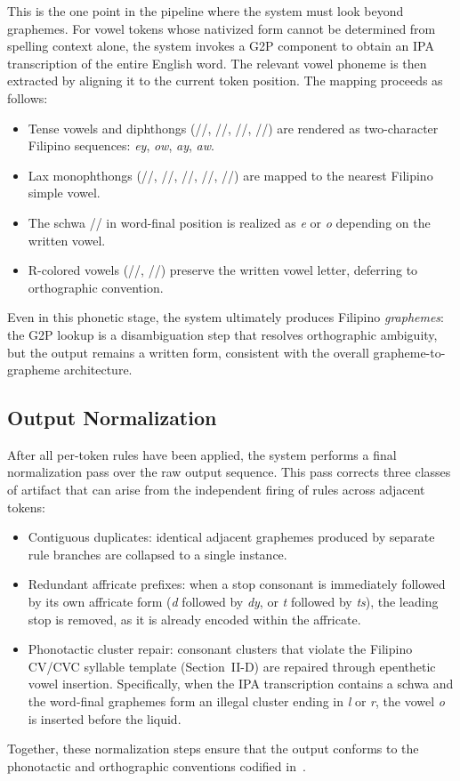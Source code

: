 This is the one point in the pipeline where the system must look beyond
graphemes. For vowel tokens whose nativized form cannot be determined from
spelling context alone, the system invokes a G2P
component to obtain an IPA transcription of the entire English word. The
relevant vowel phoneme is then extracted by aligning it to the current token
position. The mapping proceeds as follows:
\begin{itemize}
      \item Tense vowels and diphthongs (//, //, //,
            //) are rendered as two-character Filipino sequences: \emph{ey},
            \emph{ow}, \emph{ay}, \emph{aw}.
      \item Lax monophthongs (/\textipa{\ae}/, //, //, //,
            //) are mapped to the nearest Filipino simple vowel.
      \item The schwa // in word-final position is realized as \emph{e} or
            \emph{o} depending on the written vowel.
      \item R-colored vowels (//, //) preserve the written vowel
            letter, deferring to orthographic convention.
\end{itemize}
Even in this phonetic stage, the system ultimately produces Filipino
\emph{graphemes}: the G2P lookup is a disambiguation step that resolves
orthographic ambiguity, but the output remains a written form, consistent with
the overall grapheme-to-grapheme architecture.

\subsection{Output Normalization}
After all per-token rules have been applied, the system performs a final
normalization pass over the raw output sequence. This pass corrects three
classes of artifact that can arise from the independent firing of rules across
adjacent tokens:
\begin{itemize}
      \item Contiguous duplicates: identical adjacent graphemes produced
            by separate rule branches are collapsed to a single instance.
      \item Redundant affricate prefixes: when a stop consonant is
            immediately followed by its own affricate form (\emph{d} followed
            by \emph{dy}, or \emph{t} followed by \emph{ts}), the leading stop
            is removed, as it is already encoded within the affricate.
      \item Phonotactic cluster repair: consonant clusters that violate
            the Filipino CV/CVC syllable template (Section~II-D) are repaired
            through epenthetic vowel insertion. Specifically, when the IPA
            transcription contains a schwa and the word-final graphemes form an
            illegal cluster ending in \emph{l} or \emph{r}, the vowel \emph{o}
            is inserted before the liquid.
\end{itemize}

Together, these normalization steps ensure that the output conforms to the
phonotactic and orthographic conventions codified in~\cite{almario2014}.